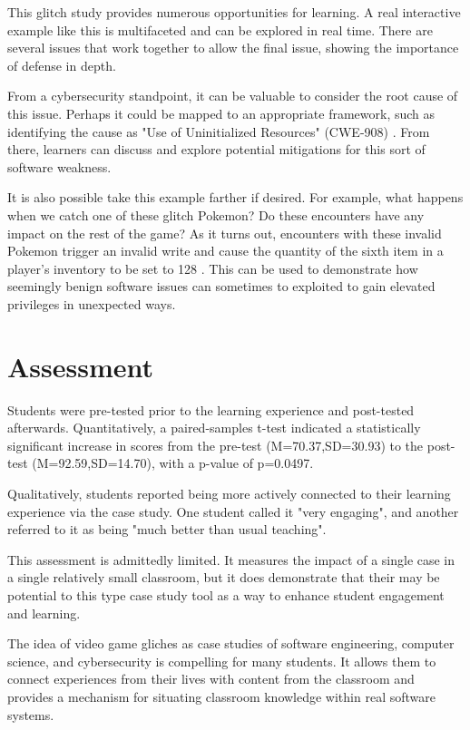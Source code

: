 \documentclass[letterpaper]{article}
\begin{document}
This glitch study provides numerous opportunities for learning. A real interactive example like this is multifaceted and can be explored in real time. There are several issues that work together to allow the final issue, showing the importance of defense in depth.

From a cybersecurity standpoint, it can be valuable to consider the root cause of this issue. Perhaps it could be mapped to an appropriate framework, such as identifying the cause as "Use of Uninitialized Resources" (CWE-908) \cite{mitre2012}. From there, learners can discuss and explore potential mitigations for this sort of software weakness.

It is also possible take this example farther if desired. For example, what happens when we catch one of these glitch Pokemon? Do these encounters have any impact on the rest of the game? As it turns out, encounters with these invalid Pokemon trigger an invalid write and cause the quantity of the sixth item in a player's inventory to be set to 128 \cite{bulbapedia2010}. This can be used to demonstrate how seemingly benign software issues can sometimes to exploited to gain elevated privileges in unexpected ways.

\section{Assessment}
Students were pre-tested prior to the learning experience and post-tested afterwards. Quantitatively, a paired-samples t-test indicated a statistically significant increase in scores from the pre-test (M=70.37,SD=30.93) to the post-test (M=92.59,SD=14.70), with a p-value of p=0.0497.

Qualitatively, students reported being more actively connected to their learning experience via the case study. One student called it "very engaging", and another referred to it as being "much better than usual teaching".

This assessment is admittedly limited. It measures the impact of a single case in a single relatively small classroom, but it does demonstrate that their may be potential to this type case study tool as a way to enhance student engagement and learning.


The idea of video game gliches as case studies of software engineering, computer science, and cybersecurity is compelling for many students. It allows them to connect experiences from their lives with content from the classroom and provides a mechanism for situating classroom knowledge within real software systems.
\end{document}
